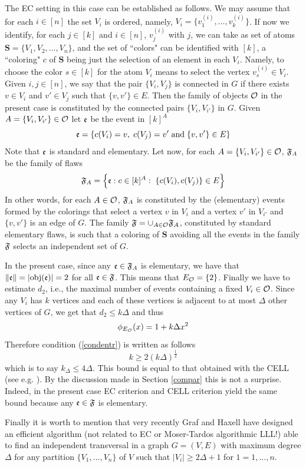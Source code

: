 \documentclass[11pt]{article}
\let\D=\Delta \let\F=\Phi \let\G=\Gamma \let\L=\Lambda \let\Th=\Theta
\let\\=\noindent
\begin{document}
\\The EC setting in this case can be established as follows.
We may assume that  for each $i\in [n]$ the set $V_i$ is ordered,
namely, $V_i=\{v_1^{(i)}, \dots , v_k^{(i)}\}$. If now we identify, for each $j\in [k]$ and
$i\in [n]$,  $v_j^{(i)}$ with $j$,   we can take as  set of atoms $\mathbf{S}=\{V_1,V_2,\dots, V_n\}$, and the
 set of ``colors"  can be identified  with $[k]$,  a ``coloring" $c$ of $\mathbf{S}$ being just the
 selection of an element in each $V_i$. Namely, to choose the color $s\in [k]$ for the atom $V_i$ means
 to select the vertex $v^{(i)}_s\in V_i$.
Given $i,j\in [n]$, we say that the pair $\{V_i,V_j\}$ is connected in $G$ if there exists
$v\in V_i$ and $v'\in V_j$ such that $\{v,v'\}\in E$.
Then the family of objects ${{\mathcal O}}$ in the present case
is constituted by the connected pairs $\{V_i, V_{i'}\}$ in $G$. Given $A=\{V_i, V_{i'}\}\in {{\mathcal O}}$ let
${\mathfrak{e}}$ be the event in $[k]^A$
$$
{\mathfrak{e}}=\{c(V_i)=v,\; c(V_j)=v' \;\mbox{and} \;\{v,v'\}\in E\}
$$
Note that ${\mathfrak{e}}$ is standard and elementary.
Let now, for each $A=\{V_i, V_{i'}\}\in {{\mathcal O}}$,  ${\mathfrak{F}}_A$  be the family of flaws
$$
{\mathfrak{F}}_A=\Big\{{\mathfrak{e}}: c\in [k]^A:\;\{c(V_i), c(V_j)\}\in E\Big\}
$$
In other words, for each $A\in {{\mathcal O}}$, ${\mathfrak{F}}_A$ is constituted  by  the (elementary) events formed by the colorings that select a vertex $v$ in $V_i$
and a  vertex $v'$ in $V_{i'}$ and $\{v,v'\}$ is an edge of $G$. The family
${\mathfrak{F}}=\cup_{A\in {{\mathcal O}}}{\mathfrak{F}}_A$,  constituted by standard elementary flaws, is such that a
coloring of $\mathbf{S}$ avoiding all the events in the family ${\mathfrak{F}}$ selects an independent set of $G$.

\\In the present case, since
any ${\mathfrak{e}}\in {\mathfrak{F}}_A$ is elementary, we have that $\|{\mathfrak{e}}\|=|{\rm obj}({\mathfrak{e}})|=2$ for all ${\mathfrak{e}}\in {\mathfrak{F}}$.
This means that $E_{{\mathcal O}}=\{2\}$.
Finally  we have to estimate  $d_2$, i.e., the maximal number of events  containing a fixed $V_i\in {{\mathcal O}}$.
Since any $V_i$ has $k$ vertices
and each of these vertices is adjacent to at most $\D$ other vertices of $G$, we get that
$d_2\leq k\D$ and thus
$$
\phi_\EA(x)=1+ k\D x^2
$$
Therefore condition (\ref{condentr}) is written as follows
$$
k \ge 2(k\D)^{\frac{1}{2}}
$$
which is to say $k_\D\le  4\D$. This bound is  equal to that obtained with the CELL (see e.g. \cite{BFPS}). By the discussion
made in Section \ref{compar} this is not a surprise. Indeed, in the present case
EC criterion and CELL criterion yield the same bound because any ${\mathfrak{e}}\in {\mathfrak{F}}$ is elementary.

\\Finally it is worth to mention that very recently  Graf and Haxell \cite{GH} have designed an efficient algorithm (not related to EC or Moser-Tardos algorithmic LLL!) able to find an independent  transversal in a graph $G=(V,E)$ with maximum degree $\D$ for any partition
$\{V_1,\dots, V_n\}$ of $V$ such that $|V_i|\ge 2\D+1$ for $1=1,\dots, n$.
\end{document}
